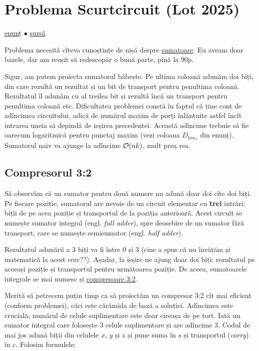 \documentclass[../main.tex]{subfiles}
\begin{document}
\section{Problema Scurtcircuit (Lot 2025)}
\label{problem:scurtcircuit}

\href{https://kilonova.ro/problems/3805}{enunț}
$\bullet$
\hyperref[code:scurtcircuit]{sursă}

Problema necesită cîteva cunoștințe de nișă despre \href{https://en.wikipedia.org/wiki/Adder_(electronics)}{sumatoare}. Eu aveam doar bazele, dar am reușit să redescopăr o bună parte, pînă la 90p. 

Sigur, am putem proiecta sumatorul băbește. Pe ultima coloană adunăm doi biți, din care rezultă un rezultat și un bit de transport pentru penultima coloană. Rezultatul îl adunăm cu al treilea bit și rezultă încă un transport pentru penultima coloană etc. Dificultatea problemei constă în faptul că ține cont de adîncimea circuitului, adică de numărul maxim de porți înlănțuite astfel încît intrarea uneia să depindă de ieșirea precedentei. Această adîncime trebuie să fie oarecum logaritmică pentru punctaj maxim (vezi coloana $D_{lim_5}$ din enunț). Sumatorul naiv va ajunge la adîncime $\mathcal{O}(nk)$, mult prea rea.

\subsection{Compresorul 3:2}

Să observăm că un sumator pentru două numere nu adună doar doi cîte doi biți. Pe fiecare poziție, sumatorul are nevoie de un circuit elementar cu \textbf{trei} intrări: biții de pe acea poziție și transportul de la poziția anterioară. Acest circuit se numește sumator integral (engl. \textit{full adder}), spre deosebire de un sumator fără transport, care se numește semisumator (engl. \textit{half adder}).

Rezultatul adunării a 3 biți va fi între 0 și 3 (cine a spus că nu învățăm și matematică la acest cerc??). Așadar, la ieșire ne ajung doar doi biți: rezultatul pe aceeași poziție și transportul pentru următoarea poziție. De aceea, sumatoarele integrale se mai numesc și \href{https://en.wikipedia.org/wiki/Adder_(electronics)#3:2_compressors}{compresoare 3:2}.

Merită să petrecem puțin timp ca să proiectăm un compresor 3:2 cît mai eficient (conform problemei), căci este cărămida de bază a soluției. Adîncimea este crucială; numărul de celule suplimentare este doar cireașa de pe tort. Iată un sumator integral care folosește 3 celule suplimentare și are adîncime 3. Codul de mai jos adună biții din celulele $x$, $y$ și $z$ și pune suma în $s$ și transportul (\textit{carry}) în $c$. Folosim formulele:
\end{document}

